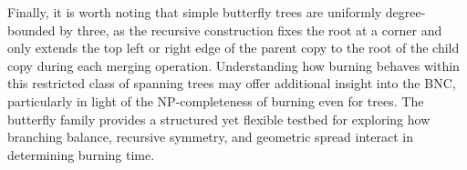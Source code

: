 \documentclass{article}
\begin{document}
Finally, it is worth noting that simple butterfly trees are uniformly degree-bounded by three, as the recursive construction fixes the root at a corner and only extends the top left or right edge of the parent copy to the root of the child copy during each merging operation. Understanding how burning behaves within this restricted class of spanning trees may offer additional insight into the BNC, particularly in light of the NP-completeness of burning even for trees. The butterfly family provides a structured yet flexible testbed for exploring how branching balance, recursive symmetry, and geometric spread interact in determining burning time.


\begin{figure}[t]
\centering
{}
\end{figure}
\end{document}
